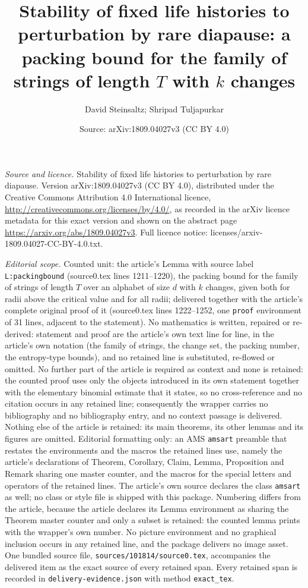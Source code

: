 \documentclass[10pt,a4paper]{amsart}
\title[Stability of fixed life histories to per]{Stability of fixed life histories to perturbation by rare diapause: a packing bound for the family of strings of length $T$ with $k$ changes}
\author{David Steinsaltz; Shripad Tuljapurkar}
\date{Source: arXiv:1809.04027v3 (CC BY 4.0)}
\theoremstyle{plain}
\begin{document}
\maketitle
\noindent\emph{Source and licence.} Stability of fixed life histories to perturbation by rare diapause. Version arXiv:1809.04027v3 (CC BY 4.0), distributed under the Creative Commons Attribution 4.0 International licence, \url{http://creativecommons.org/licenses/by/4.0/}, as recorded in the arXiv licence metadata for this exact version and shown on the abstract page \url{https://arxiv.org/abs/1809.04027v3}. Full licence notice: licenses/arxiv-1809.04027-CC-BY-4.0.txt.\par\smallskip

\noindent\textit{Editorial scope.} Counted unit: the article's Lemma with source label \texttt{L:packingbound} (source0.tex lines 1211--1220), the packing bound for the family of strings of length $T$ over an alphabet of size $d$ with $k$ changes, given both for radii above the critical value and for all radii; delivered together with the article's complete original proof of it (source0.tex lines 1222--1252, one \texttt{proof} environment of 31 lines, adjacent to the statement). No mathematics is written, repaired or re-derived: statement and proof are the article's own text line for line, in the article's own notation (the family of strings, the change set, the packing number, the entropy-type bounds), and no retained line is substituted, re-flowed or omitted. No further part of the article is required as context and none is retained: the counted proof uses only the objects introduced in its own statement together with the elementary binomial estimate that it states, so no cross-reference and no citation occurs in any retained line; consequently the wrapper carries no bibliography and no bibliography entry, and no context passage is delivered. Nothing else of the article is retained: its main theorems, its other lemmas and its figures are omitted. Editorial formatting only: an AMS \texttt{amsart} preamble that restates the environments and the macros the retained lines use, namely the article's declarations of Theorem, Corollary, Claim, Lemma, Proposition and Remark sharing one master counter, and the macros for the special letters and operators of the retained lines. The article's own source declares the class \texttt{amsart} as well; no class or style file is shipped with this package. Numbering differs from the article, because the article declares its Lemma environment as sharing the Theorem master counter and only a subset is retained: the counted lemma prints with the wrapper's own number. No picture environment and no graphical inclusion occurs in any retained line, and the package delivers no image asset. One bundled source file, \texttt{sources/101814/source0.tex}, accompanies the delivered item as the exact source of every retained span. Every retained span is recorded in \texttt{delivery-evidence.json} with method \texttt{exact\_tex}.
\end{document}
